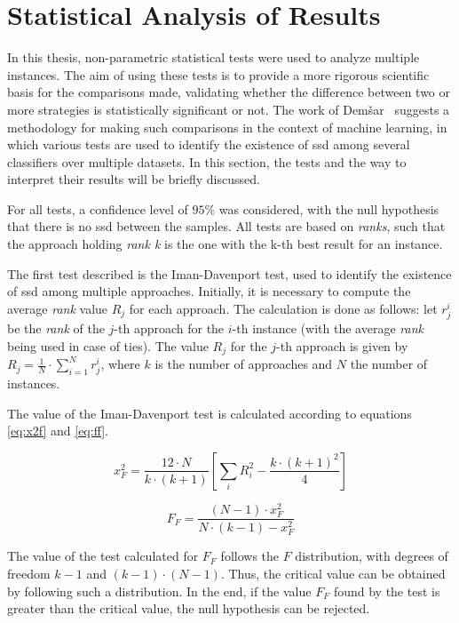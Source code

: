 \section{Statistical Analysis of Results}\label{subsec:statistical-analysis}

In this thesis, non-parametric statistical tests were used to analyze multiple instances. The aim of using these tests is to provide a more rigorous scientific basis for the comparisons made, validating whether the difference between two or more strategies is statistically significant or not. The work of Dem\v{s}ar~\cite{demsar:2006} suggests a methodology for making such comparisons in the context of machine learning, in which various tests are used to identify the existence of \gls{ssd} among several classifiers over multiple datasets. In this section, the tests and the way to interpret their results will be briefly discussed.

For all tests, a confidence level of $95\%$ was considered, with the null hypothesis that there is no \gls{ssd} between the samples. All tests are based on \textit{ranks}, such that the approach holding \textit{rank k} is the one with the k-th best result for an instance.

The first test described is the Iman-Davenport test, used to identify the existence of \gls{ssd} among multiple approaches. Initially, it is necessary to compute the average \textit{rank} value $R_j$ for each approach. The calculation is done as follows: let $r_j^i$ be the \textit{rank} of the $j$-th approach for the $i$-th instance (with the average \textit{rank} being used in case of ties). The value $R_j$ for the $j$-th approach is given by $R_j = \frac{1}{N} \cdot \sum_{i=1}^{N} r_j^i$, where $k$ is the number of approaches and $N$ the number of instances.

The value of the Iman-Davenport test is calculated according to equations \eqref{eq:x2f} and \eqref{eq:ff}.

\begin{equation}
    x^2_F = \frac{12 \cdot N}{k \cdot (k + 1)} \left[ \sum_{i} R^2_{i} - \frac{k \cdot (k+1)^2}{4} \right] \label{eq:x2f}
\end{equation}

\begin{equation}
    F_F = \frac{(N - 1) \cdot x^2_F}{N \cdot (k - 1) - x^2_F} \label{eq:ff}
\end{equation}

The value of the test calculated for $F_F$ follows the $F$ distribution, with degrees of freedom $k - 1$ and $(k - 1) \cdot (N - 1)$. Thus, the critical value can be obtained by following such a distribution. In the end, if the value $F_F$ found by the test is greater than the critical value, the null hypothesis can be rejected.

